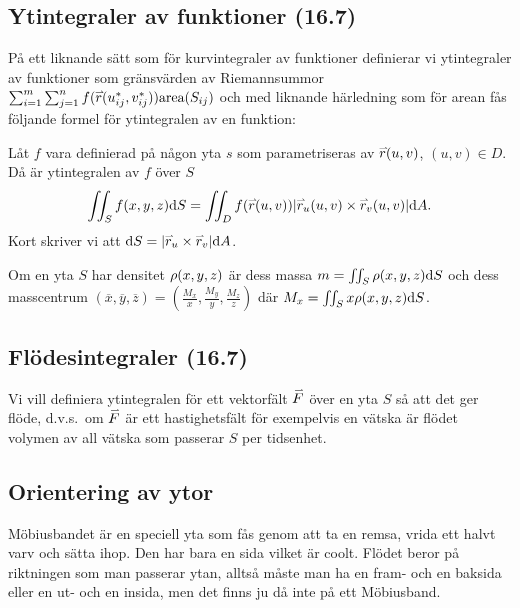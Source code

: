 \documentclass[a4paper]{article}
\begin{document}
\providecommand\fname{}
\renewcommand\fname{19-10-15}

\subsection{Ytintegraler av funktioner (16.7)}
På ett liknande sätt som för kurvintegraler av funktioner definierar vi 
ytintegraler av funktioner som gränsvärden av Riemannsummor \(
    \sum_{i=1}^m \sum_{j=1}^n f(\accentset{\rightharpoonup}{r}(u_{ij}^*, v_{ij}^*)) \text{area}(S_{ij})
\) och med liknande härledning som för arean fås följande formel för ytintegralen
av en funktion:

\begin{sats}
    Låt \(
        f
    \) vara definierad på någon yta \(
        s
    \) som parametriseras av \(
        \accentset{\rightharpoonup}{r}(u,v)
    \), \(
        (u,v) \in D
    \). Då är ytintegralen av \(
        f
    \) över \(
        S
    \) \[
        \iint_S f(x,y,z) \dd S = \iint_D f(\accentset{\rightharpoonup}{r}(u,v)) 
            \abs{\accentset{\rightharpoonup}{r}_u(u,v) \times \accentset{\rightharpoonup}{r}_v(u,v)} \dd A.
    \] 
    Kort skriver vi att \(
        \dd S = \abs{\accentset{\rightharpoonup}{r}_u \times \accentset{\rightharpoonup}{r}_v} \dd A
    \).
\end{sats}

\begin{sats}
    Om en yta \(
        S
    \) har densitet \(
        \rho(x,y,z) 
    \) är dess massa \(
        m = \iint_S \rho(x,y,z) \dd S
    \) och dess masscentrum \(
        (\overline{x}, \overline{y}, \overline{z}) = (\frac{M_x}{x}, \frac{M_y}{y}, \frac{M_z}{z} )
    \) där \(
        M_x = \iint_S x \rho(x,y,z) \dd S
    \).
\end{sats}

\subsection{Flödesintegraler (16.7)}
Vi vill definiera ytintegralen för ett vektorfält \(
    \accentset{\rightharpoonup}{F} 
\) över en yta \(
    S
\) så att det ger flöde, d.v.s.\ om \(
    \accentset{\rightharpoonup}{F}
\) är ett hastighetsfält för exempelvis en vätska är flödet volymen av all vätska
som passerar \(
    S
\) per tidsenhet. 

\subsection{Orientering av ytor}
Möbiusbandet är en speciell yta som fås genom att ta en remsa, vrida ett halvt 
varv och sätta ihop. Den har bara en sida vilket är coolt. 
Flödet beror på riktningen som man passerar ytan, alltså måste man ha en fram-
och en baksida eller en ut- och en insida, men det finns ju då inte på ett 
Möbiusband. 
\end{document}

